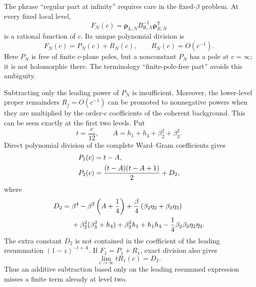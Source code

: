\documentclass[11pt]{article}
\newcommand{\R}{\mathrm R}
\begin{document}
The phrase ``regular part at infinity'' requires care in the fixed-\(\beta\)
problem.  At every fixed local level,
\begin{equation}
 F_N(c)=
 \bm\rho_{L,N}B_{\R,N}^{-1}\bm\rho_{R,N}^{\mathsf T}
 \label{eq:raw-local-level-coefficient}
\end{equation}
is a rational function of \(c\).  Its unique polynomial division is
\begin{equation}
 F_N(c)=P_N(c)+R_N(c),
 \qquad
 R_N(c)=O(c^{-1}).
 \label{eq:raw-polynomial-division}
\end{equation}
Here \(P_N\) is free of finite \(c\)-plane poles, but a nonconstant
\(P_N\) has a pole at \(c=\infty\); it is not holomorphic there.  The
terminology ``finite-pole-free part'' avoids this ambiguity.

Subtracting only the leading power of \(P_N\) is insufficient.  Moreover,
the lower-level proper remainders \(R_j=O(c^{-1})\) can be promoted to
nonnegative powers when they are multiplied by the order-\(c\) coefficients
of the coherent background.  This can be seen exactly at the first two
levels.  Put
\begin{equation}
 t=\frac c{12},
 \qquad
 A=h_1+h_4+\beta_2^2+\beta_3^2.
 \label{eq:infinity-ledger-tA}
\end{equation}
Direct polynomial division of the complete Ward--Gram coefficients gives
\begin{align}
 P_1(c)&=t-A,
 \notag\\
 P_2(c)&=\frac{(t-A)(t-A+1)}2+D_2,
 \label{eq:raw-polynomial-parts-level-two}
\end{align}
where
\begin{align}
 D_2={}&
 \beta^4-\beta^2\left(A+\frac14\right)
 +\frac{\beta}{4}
  \left(\beta_2\eta_2+\beta_3\eta_3\right)
 \notag\\
 &+\beta_2^2(\beta_3^2+h_4)
 +\beta_3^2h_1+h_1h_4
 -\frac14\beta_2\beta_3\eta_2\eta_3.
 \label{eq:raw-level-two-extra-polynomial}
\end{align}
The extra constant \(D_2\) is not contained in the coefficient of the
leading resummation \((1-z)^{-t+A}\).  If
\(F_1=P_1+R_1\), exact division also gives
\begin{equation}
 \lim_{c\to\infty}tR_1(c)=D_2.
 \label{eq:promoted-level-one-remainder}
\end{equation}
Thus an additive subtraction based only on the leading resummed expression
misses a finite term already at level two.
\end{document}
